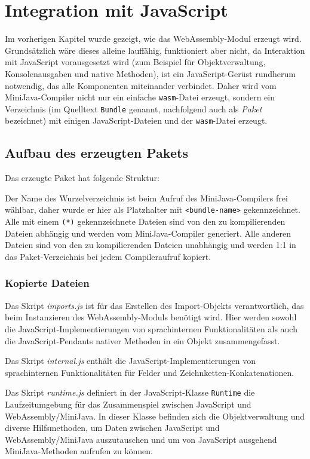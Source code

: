 \chapter{Integration mit JavaScript}

Im vorherigen Kapitel wurde gezeigt, wie das WebAssembly-Modul erzeugt wird. Grundsätzlich wäre dieses alleine lauffähig, funktioniert aber nicht, da Interaktion mit Ja\-va\-Script vorausgesetzt wird (zum Beispiel für Objektverwaltung, Konsolenausgaben und native Methoden), ist ein JavaScript-Gerüst rundherum notwendig, das alle Komponenten miteinander verbindet. Daher wird vom MiniJava-Compiler nicht nur ein einfache \lstinline{wasm}-Datei erzeugt, sondern ein Verzeichnis (im Quelltext \lstinline{Bundle} genannt, nachfolgend auch als \emph{Paket} bezeichnet) mit einigen JavaScript-Dateien und der \lstinline{wasm}-Datei erzeugt.

\section{Aufbau des erzeugten Pakets}

Das erzeugte Paket hat folgende Struktur:


Der Name des Wurzelverzeichnis ist beim Aufruf des MiniJava-Compilers frei wählbar, daher wurde er hier als Platzhalter mit \lstinline{<bundle-name>} gekennzeichnet. Alle mit einem \lstinline{(*)} gekennzeichnete Dateien sind von den zu kompilierenden Dateien abhängig und werden vom MiniJava-Compiler generiert. Alle anderen Dateien sind von den zu kompilierenden Dateien unabhängig und werden 1:1 in das Paket-Verzeichnis bei jedem Compileraufruf kopiert.

\subsection{Kopierte Dateien}

Das Skript \emph{imports.js} ist für das Erstellen des Import-Objekts verantwortlich, das beim Instanzieren des WebAssembly-Moduls benötigt wird. Hier werden sowohl die Ja\-va\-Script-Im\-ple\-men\-tie\-rungen von sprachinternen Funktionalitäten als auch die Ja\-va\-Script-Pen\-dants nativer Methoden in ein Objekt zusammengefasst.

Das Skript \emph{internal.js} enthält die JavaScript-Implementierungen von sprachinternen Funktionalitäten für Felder und Zeichnketten-Konkatenationen.

Das Skript \emph{runtime.js} definiert in der JavaScript-Klasse \lstinline{Runtime} die Laufzeitumgebung für das Zusammenspiel zwischen JavaScript und WebAssembly/MiniJava. In dieser Klasse befinden sich die Objektverwaltung und diverse Hilfsmethoden, um Daten zwischen JavaScript und WebAssembly/MiniJava auszutauschen und um von JavaScript ausgehend MiniJava-Methoden aufrufen zu können.

